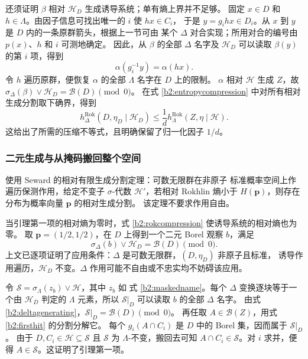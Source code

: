 \documentclass[UTF8,zihao=-4,a4paper]{ctexart}
\numberwithin{equation}{section}
\begin{document}
还须证明 $\beta$ 相对 $\mathcal H_D$ 生成诱导系统；单有熵上界并不足够。
固定 $x\in D$ 和 $h\in\Lambda$。由因子信息可找出唯一的 $i$ 使 $hx\in C_i$，
于是 $y=g_ihx\in D_i$。从 $x$ 到 $y$ 是 $D$ 内的一条原群箭头，根据上一节可由
某个 $\Delta$ 对合实现；所用对合的编号由 $p(x)$、$h$ 和 $i$ 可测地确定。
因此，从 $\beta$ 的全部 $\Delta$ 名字及 $\mathcal H_D$ 可以读取 $\beta(y)$ 的第
$i$ 项，得到
\[
 \alpha(g_i^{-1}y)=\alpha(hx).
\]
令 $h$ 遍历原群，便恢复 $\alpha$ 的全部 $\Lambda$ 名字在 $D$ 上的限制。
$\alpha$ 相对 $\mathcal H$ 生成 $Z$，故
$\sigma_\Delta(\beta)\vee\mathcal H_D=\mathcal B(D)\pmod0$。
在式 \eqref{b2:entropycompression} 中对所有相对生成分割取下确界，得到
\begin{equation}\label{b2:rokcompression}
 h^{\mathrm{Rok}}_\Delta(D,\eta_D\mid\mathcal H_D)
 \le\frac1d h^{\mathrm{Rok}}_\Lambda(Z,\eta\mid\mathcal H).
\end{equation}
这给出了所需的压缩不等式，且明确保留了归一化因子 $1/d$。

\subsubsection{二元生成与从掩码搬回整个空间}\label{b2:binary}

使用 Seward 的相对有限生成分割定理\cite[Theorem~1.1]{Seward}：可数无限群在非原子
标准概率空间上作遍历保测作用，给定不变子 $\sigma$-代数 $\mathcal H'$，若相对
Rokhlin 熵小于 $H(\mathbf p)$，则存在分布为概率向量 $\mathbf p$ 的相对生成分割。
该定理不要求作用自由。

当引理第一项的相对熵为零时，式 \eqref{b2:rokcompression} 使诱导系统的相对熵也为零。
取 $\mathbf p=(1/2,1/2)$，在 $D$ 上得到一个二元 Borel 观察 $b$，满足
\begin{equation}\label{b2:deltagenerating}
 \sigma_\Delta(b)\vee\mathcal H_D=\mathcal B(D)\pmod0.
\end{equation}
上文已逐项证明了应用条件：$\Delta$ 是可数无限群，$(D,\eta_D)$ 非原子且标准，
诱导作用遍历，$\mathcal H_D$ 不变。$\Delta$ 作用可能不自由或不忠实均不妨碍该应用。

令 $\mathcal S=\sigma_\Lambda(z_b)\vee\mathcal H$，其中 $z_b$ 如
式 \eqref{b2:maskedname}。每个 $\Delta$ 变换逐块等于一个由 $\mathcal H_D$ 判定的
$\Lambda$ 元素，所以 $\mathcal S|_D$ 可以读取 $b$ 的全部 $\Delta$ 名字。
由式 \eqref{b2:deltagenerating}，$\mathcal S|_D=\mathcal B(D)\pmod0$。
再任取 $A\in\mathcal B(Z)$，用式 \eqref{b2:firsthit} 的分割分解它。
每个 $g_i(A\cap C_i)$ 是 $D$ 中的 Borel 集，因而属于 $\mathcal S|_D$。
由于 $D,C_i\in\mathcal H\subseteq\mathcal S$ 且 $\mathcal S$ 为
$\Lambda$-不变，搬回去可知 $A\cap C_i\in\mathcal S$。对 $i$ 求并，便得
$A\in\mathcal S$。这证明了引理第一项。
\end{document}
